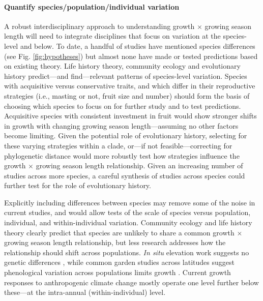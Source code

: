 \documentclass[11pt]{article}
\begin{document}
\paragraph{Quantify species/population/individual variation} 

A robust interdisciplinary approach to understanding growth $\times$ growing season length will need to integrate disciplines that focus on variation at the species-level and below. To date, a handful of studies have mentioned species differences (see Fig. \ref{fig:hypotheses}) but almost none have made or tested predictions based on existing theory. Life history theory, community ecology and evolutionary history predict---and find---relevant patterns of species-level variation. Species with acquisitive versus conservative traits, and which differ in their reproductive strategies (i.e., masting or not, fruit size and number) should form the basis of choosing which species to focus on for further study and to test predictions. Acquisitive species with consistent investment in fruit would show stronger shifts in growth with changing growing season length---assuming no other factors become limiting. Given the potential role of evolutionary history, selecting for these varying strategies within a clade, or---if not feasible---correcting for phylogenetic distance would more robustly test how strategies influence the growth $\times$ growing season length relationship. Given an increasing number of studies across more species, a careful synthesis of studies across species could further test for the role of evolutionary history. 

Explicitly including differences between species may remove some of the noise in current studies, and would allow tests of the scale of species versus population, individual, and within-individual variation. Community ecology and life history theory clearly predict that species are unlikely to share a common growth $\times$ growing season length relationship, but less research addresses how the relationship should shift across populations. \emph{In situ} elevation work suggests no genetic differences \citep{king2013tree}, while common garden studies across latitudes suggest phenological variation across populations limits growth \citep{soolanayakanahally2013timing}. Current growth responses to anthropogenic climate change mostly operate one level further below these---at the intra-annual (within-individual) level. 
\end{document}
